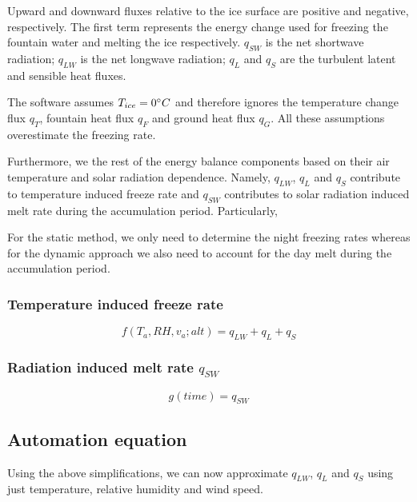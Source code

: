 \documentclass[utf8]{frontiersSCNS}
\begin{document}
Upward and downward fluxes relative to the ice surface are positive and negative, respectively. The first
term represents the energy change used for freezing the fountain water and melting the ice respectively.
$q_{SW}$ is the net shortwave radiation; $q_{LW}$ is the net longwave radiation; $q_{L}$ and $q_{S}$ are the
turbulent latent and sensible heat fluxes. 

The software assumes $T_{ice} = 0 \degree C$ and therefore ignores the temperature change flux $q_{T}$, fountain
heat flux $q_{F}$ and ground heat flux $q_{G}$. All these assumptions overestimate the freezing rate.

Furthermore, we the rest of the energy balance components based on their air temperature and solar
radiation dependence. Namely, $q_{LW}$, $q_{L}$ and $q_{S}$ contribute to temperature induced freeze rate and
$q_{SW}$ contributes to solar radiation induced melt rate during the accumulation period.  Particularly,

For the static method, we only need to determine the night freezing rates whereas for the dynamic approach we
also need to account for the day melt during the accumulation period.

\subsubsection{Temperature induced freeze rate } \label{sec:Temp_rate}

\begin{equation}
	 f(T_a, RH, v_a; alt) = q_{LW} + q_{L} + q_{S}
	\label{eqn:Temp_rate}
\end{equation}

\subsubsection{Radiation induced melt rate \texorpdfstring{$q_{SW}$}{Lg}}
\label{sec:SW}
\begin{equation}
	 g(time) = q_{SW}
	\label{eqn:Temp_rate}
\end{equation}

\subsection{Automation equation}

Using the above simplifications, we can now approximate $q_{LW}$, $q_{L}$ and $q_{S}$ using just temperature,
relative humidity and wind speed. 
\end{document}
